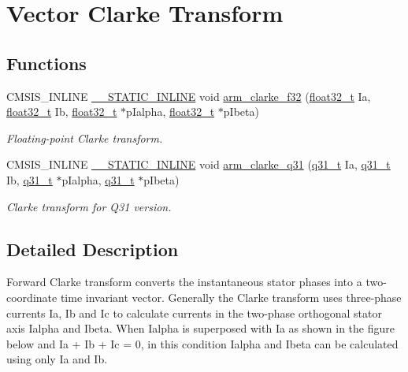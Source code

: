 \hypertarget{group__clarke}{}\section{Vector Clarke Transform}
\label{group__clarke}
\subsection*{Functions}
\begin{DoxyCompactItemize}
\item 
C\+M\+S\+I\+S\+\_\+\+I\+N\+L\+I\+NE \mbox{\hyperlink{cmsis__iccarm_8h_aba87361bfad2ae52cfe2f40c1a1dbf9c}{\+\_\+\+\_\+\+S\+T\+A\+T\+I\+C\+\_\+\+I\+N\+L\+I\+NE}} void \mbox{\hyperlink{group__clarke_gabbfa27c68837d22f03d6c6259569caa8}{arm\+\_\+clarke\+\_\+f32}} (\mbox{\hyperlink{arm__math_8h_a4611b605e45ab401f02cab15c5e38715}{float32\+\_\+t}} Ia, \mbox{\hyperlink{arm__math_8h_a4611b605e45ab401f02cab15c5e38715}{float32\+\_\+t}} Ib, \mbox{\hyperlink{arm__math_8h_a4611b605e45ab401f02cab15c5e38715}{float32\+\_\+t}} $\ast$p\+Ialpha, \mbox{\hyperlink{arm__math_8h_a4611b605e45ab401f02cab15c5e38715}{float32\+\_\+t}} $\ast$p\+Ibeta)
\begin{DoxyCompactList}\small\item\em Floating-\/point Clarke transform. \end{DoxyCompactList}\item 
C\+M\+S\+I\+S\+\_\+\+I\+N\+L\+I\+NE \mbox{\hyperlink{cmsis__iccarm_8h_aba87361bfad2ae52cfe2f40c1a1dbf9c}{\+\_\+\+\_\+\+S\+T\+A\+T\+I\+C\+\_\+\+I\+N\+L\+I\+NE}} void \mbox{\hyperlink{group__clarke_ga0c69ebd2855ce6d34008eff808881e78}{arm\+\_\+clarke\+\_\+q31}} (\mbox{\hyperlink{arm__math_8h_adc89a3547f5324b7b3b95adec3806bc0}{q31\+\_\+t}} Ia, \mbox{\hyperlink{arm__math_8h_adc89a3547f5324b7b3b95adec3806bc0}{q31\+\_\+t}} Ib, \mbox{\hyperlink{arm__math_8h_adc89a3547f5324b7b3b95adec3806bc0}{q31\+\_\+t}} $\ast$p\+Ialpha, \mbox{\hyperlink{arm__math_8h_adc89a3547f5324b7b3b95adec3806bc0}{q31\+\_\+t}} $\ast$p\+Ibeta)
\begin{DoxyCompactList}\small\item\em Clarke transform for Q31 version. \end{DoxyCompactList}\end{DoxyCompactItemize}


\subsection{Detailed Description}
Forward Clarke transform converts the instantaneous stator phases into a two-\/coordinate time invariant vector. Generally the Clarke transform uses three-\/phase currents {\ttfamily Ia, Ib and Ic} to calculate currents in the two-\/phase orthogonal stator axis {\ttfamily Ialpha} and {\ttfamily Ibeta}. When {\ttfamily Ialpha} is superposed with {\ttfamily Ia} as shown in the figure below  and {\ttfamily Ia + Ib + Ic = 0}, in this condition {\ttfamily Ialpha} and {\ttfamily Ibeta} can be calculated using only {\ttfamily Ia} and {\ttfamily Ib}.

